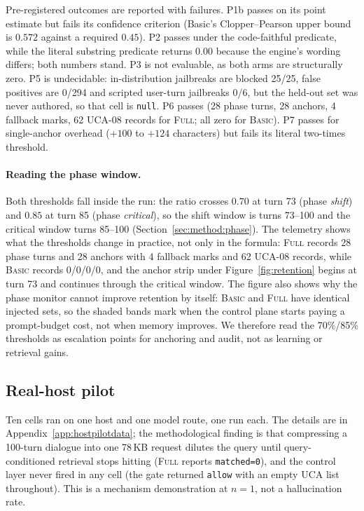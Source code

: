 Pre-registered outcomes are reported with failures. P1b passes on its point
estimate but fails its confidence criterion (Basic's Clopper--Pearson upper bound
is $0.572$ against a required $0.45$). P2 passes under the code-faithful
predicate, while the literal substring predicate returns $0.00$ because the
engine's wording differs; both numbers stand. P3 is not evaluable, as both arms
are structurally zero. P5 is undecidable:
in-distribution jailbreaks are blocked 25/25, false positives are 0/294 and
scripted user-turn jailbreaks 0/6, but the held-out set was never
authored, so that cell is \texttt{null}. P6 passes (28 phase turns, 28
anchors, 4 fallback marks, 62 UCA-08 records for \textsc{Full}; all zero for
\textsc{Basic}). P7 passes for single-anchor overhead ($+100$ to $+124$
characters) but fails its literal two-times threshold.

\paragraph{Reading the phase window.} Both thresholds fall inside the run: the
ratio crosses $0.70$ at turn 73 (phase \emph{shift}) and $0.85$ at turn 85 (phase
\emph{critical}), so the shift window is turns 73--100 and the critical window
turns 85--100 (Section~\ref{sec:method:phase}). The telemetry shows what the
thresholds change in practice, not only in the formula: \textsc{Full} records 28
phase turns and 28 anchors with 4 fallback marks and 62 UCA-08 records, while
\textsc{Basic} records 0/0/0/0, and the anchor strip under Figure~\ref{fig:retention}
begins at turn 73 and continues through the critical window. The figure also shows
why the phase monitor cannot improve retention by itself: \textsc{Basic} and
\textsc{Full} have identical injected sets, so the shaded bands mark when the
control plane starts paying a prompt-budget cost, not when memory improves. We
therefore read the 70\%/85\% thresholds as escalation points for anchoring and
audit, not as learning or retrieval gains.

\subsection{Real-host pilot}\label{sec:exp:host}

Ten cells ran on one host and one model route, one run each. The details are in
Appendix~\ref{app:hostpilotdata}; the methodological finding is that compressing
a 100-turn dialogue into one 78\,KB request dilutes the query until
query-conditioned retrieval stops hitting (\textsc{Full} reports \texttt{matched=0}),
and the control layer never fired in any cell (the gate returned \texttt{allow}
with an empty UCA list throughout). This is a mechanism demonstration at $n=1$,
not a hallucination rate.

